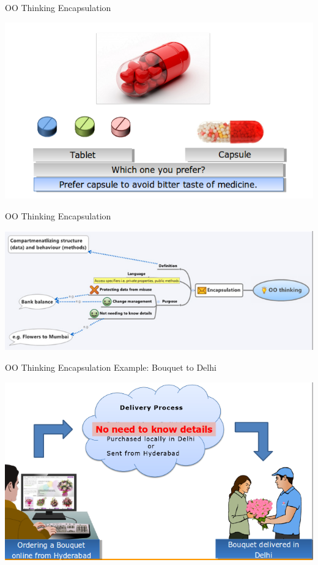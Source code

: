 \documentclass[14pt]{beamer}
\begin{document}
\begin{frame}{OO Thinking}
Encapsulation
\begin{center}
    \includegraphics[scale=0.5]{Image19.png}
\end{center}
\end{frame}
\begin{frame}{OO Thinking}
Encapsulation
\begin{center}
    \includegraphics[scale=0.5]{Image20.png}
\end{center}
\end{frame}
\begin{frame}{OO Thinking}
Encapsulation Example: Bouquet to Delhi 
\begin{center}
    \includegraphics[scale=0.5]{Image21.png}
\end{center}
\end{frame}
\end{document}
